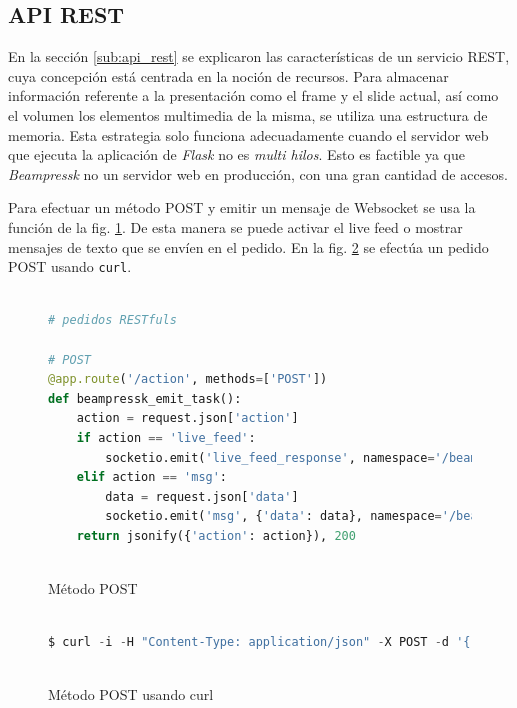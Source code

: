 		

		\subsection{API REST} %
		\label{sub:api_rest_imp}
			En la sección \ref{sub:api_rest} se explicaron las características de un servicio REST, cuya concepción está centrada en la noción de recursos. Para almacenar información referente a la presentación como el frame y el slide actual, así como el volumen los elementos multimedia de la misma, se utiliza una estructura de memoria. Esta estrategia solo funciona adecuadamente cuando el servidor web que ejecuta la aplicación de \textit{Flask} no es \textit{multi hilos}. Esto es factible ya que \textit{Beampressk} no un servidor web en producción, con una gran cantidad de accesos.

			Para efectuar un método POST y emitir un mensaje de Websocket se usa la función de la fig. \ref{fig:post_method}. De esta manera se puede activar el live feed o mostrar mensajes de texto que se envíen en el pedido. En la fig. \ref{fig:curl_post} se efectúa un pedido POST usando \texttt{curl}.

			\begin{figure}[htb]%
				\begin{lstlisting}[language=Python]%

# pedidos RESTfuls

# POST
@app.route('/action', methods=['POST'])
def beampressk_emit_task():
    action = request.json['action']
    if action == 'live_feed':
        socketio.emit('live_feed_response', namespace='/beampressk')
    elif action == 'msg':
        data = request.json['data']
        socketio.emit('msg', {'data': data}, namespace='/beampressk')
    return jsonify({'action': action}), 200  
  
				\end{lstlisting}
			\caption{Método POST}
			\label{fig:post_method}
			\end{figure}			

			\begin{figure}[htb]%
				\begin{lstlisting}[language=Python]%

$ curl -i -H "Content-Type: application/json" -X POST -d '{"action":"msg", "data":"Este es un mensaje de texto"}' http://beampressk.com:5000/action
  
				\end{lstlisting}
			\caption{Método POST usando curl}
			\label{fig:curl_post}
			\end{figure}
			
